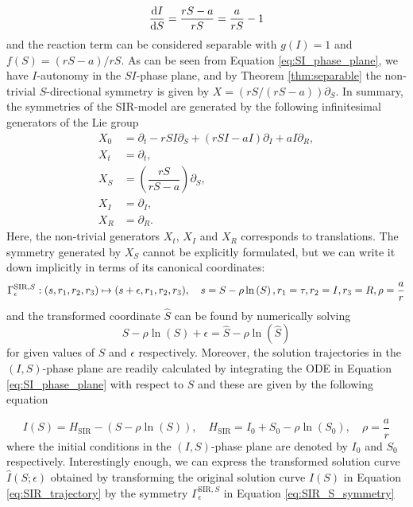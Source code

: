 \begin{equation}
\dv{I}{S}=\dfrac{rS-a}{rS}=\dfrac{a}{rS}-1
\label{eq:SI_phase_plane}
\end{equation}
and the reaction term can be considered separable with $g(I)=1$ and $f(S)=(rS-a)/rS$. As can be seen from Equation \eqref{eq:SI_phase_plane}, we have $I$-autonomy in the $SI$-phase plane, and by Theorem \ref{thm:separable} the non-trivial $S$-directional symmetry is given by $X=(rS/(rS-a))\partial_S$. In summary, the symmetries of the SIR-model are generated by the following infinitesimal generators of the Lie group
\begin{align} X_0&=\partial_t-rSI\partial_S+\left(rSI-aI\right)\partial_I+aI\partial_R\label{eq:SIR_0},\\
  X_t&=\partial_t\label{eq:SIR_t},\\
  X_S&=\left(\dfrac{rS}{rS-a}\right)\partial_S\label{eq:SIR_S},\\
  X_I&=\partial_I\label{eq:SIR_I},\\
  X_R&=\partial_R\label{eq:SIR_R}.
\end{align}
Here, the non-trivial generators $X_t$, $X_I$ and $X_R$ corresponds to translations. The symmetry generated by $X_S$ cannot be explicitly formulated, but we can write it down implicitly in terms of its canonical coordinates:
\begin{equation}
  \Gamma^{\mathrm{SIR},S}_{\epsilon}:(s,r_1,r_2,r_3)\mapsto(s+\epsilon,r_1,r_2,r_3),\quad s=S-\rho\ln\left(S\right),r_1=\tau,r_2=I,r_3=R,\rho=\dfrac{a}{r}\\
  \label{eq:SIR_S_symmetry}
\end{equation}
and the transformed coordinate $\hat{S}$ can be found by numerically solving
\begin{equation}
  S-\rho\ln\left(S\right)+\epsilon=\hat{S}-\rho\ln\left(\hat{S}\right)
  \label{eq:SIR_S_symmetry_numerics}
\end{equation}
for given values of $S$ and $\epsilon$ respectively. Moreover, the solution trajectories in the $(I,S)$-phase plane are readily calculated by integrating the ODE in Equation \eqref{eq:SI_phase_plane} with respect to $S$ and these are given by the following equation \cite{murray2002}

\begin{equation}
  I(S)=H_{\mathrm{SIR}}-(S-\rho\ln(S)),\quad H_{\mathrm{SIR}}=I_0+S_0-\rho\ln(S_0),\quad\rho=\dfrac{a}{r}
  \label{eq:SIR_trajectory}
\end{equation}
where the initial conditions in the $(I,S)$-phase plane are denoted by $I_0$ and $S_0$ respectively. Interestingly enough, we can express the transformed solution curve $\hat{I}(S;\epsilon)$ obtained by transforming the original solution curve $I(S)$ in Equation \eqref{eq:SIR_trajectory} by the symmetry $\Gamma^{\mathrm{SIR},S}_{\epsilon}$ in Equation \eqref{eq:SIR_S_symmetry}

